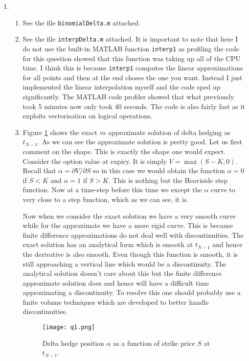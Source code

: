 \documentclass[10pt,english]{article}
\theoremstyle{plain}
\begin{document}
\begin{enumerate}
\item 
\begin{enumerate}
\item See the file \texttt{binomialDelta.m} attached.

\item See the file \texttt{interpDelta.m} attached. It is important to note that here I do not use the built-in MATLAB function \texttt{interp1} as profiling the code for this question showed that this function was taking up all of the CPU time. I think this is  because \texttt{interp1} computes the linear approximations for all points and then at the end choses the one you want. Instead I just implemented the linear interpolation myself and the code sped up significantly. The MATLAB code profiler showed that what previously took 5 minutes now only took 40 seconds.  The code is also fairly fast as it exploits vectorisation on logical operations.

\item Figure \ref{q1} shows the exact vs approximate solution of delta hedging as $t_{N-1}$. As we can see the approximate solution is pretty good. Let us first comment on the shape. This is exactly the shape one would expect. Consider the option value at expiry. It is simply $V=\max(S-K,0)$. Recall that $\alpha = \partial V/\partial S$ so in this case we would obtain the function $\alpha = 0$ if $ S<K$ and $\alpha=1$ if $ S>K$. This is nothing but the Heaviside step function. Now at a time-step before this time we except the $\alpha$ curve to very close to a step function, which as we can see, it is.

Now when we consider the exact solution we have a very smooth curve while for the approximate we have a more rigid curve. This is because finite difference approximations do not deal well with discontinuities. The exact solution has an analytical form which is smooth at $t_{N-1}$ and hence the derivative is also smooth. Even though this function is smooth, it is still approaching a vertical line which would be a discontinuity. The analytical solution doesn't care about this but the finite difference approximate solution does and hence will have a difficult time approximating a discontinuity. To resolve this one should probably use a finite volume techniques which are developed to better handle discontinuities.
\begin{figure}
\begin{center}
\texttt{[image: q1.png]}
\caption{Delta hedge position $\alpha$ as a function of strike price $S$ at $t_{N-1}$.}
\label{q1}
\end{center}
\end{figure}
\end{enumerate}


\end{enumerate}
\end{document}
